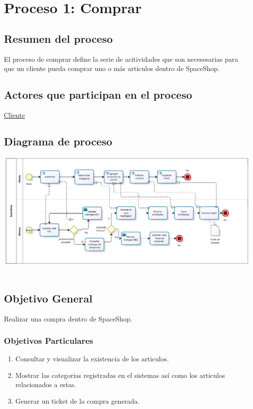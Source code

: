 \hypertarget{procesoCompra}{}
\section{Proceso 1: Comprar}

\subsection{Resumen del proceso}
	El proceso de comprar define la serie de acitividades que son necesesarias para que un cliente pueda comprar uno o m\'as articulos dentro de SpaceShop. \\
	
\subsection{Actores que participan en el proceso}
	\hyperlink{Cliente}{Cliente} \\
	
\subsection{Diagrama de proceso}
	\includegraphics[scale=0.60]{images/procesos/ProcesoComprar.png}
	\\ \\
\subsection{Objetivo General}
	Realizar una compra dentro de SpaceShop. 
	
\subsubsection{Objetivos Particulares}
	\begin{enumerate}
		\item Consultar y visualizar la existencia de los articulos.
		\item Mostrar las categorias registradas en el sistemas as\'i como los articulos relacionados a estas.
		\item Generar un ticket de la compra generada.
	\end{enumerate}
	
